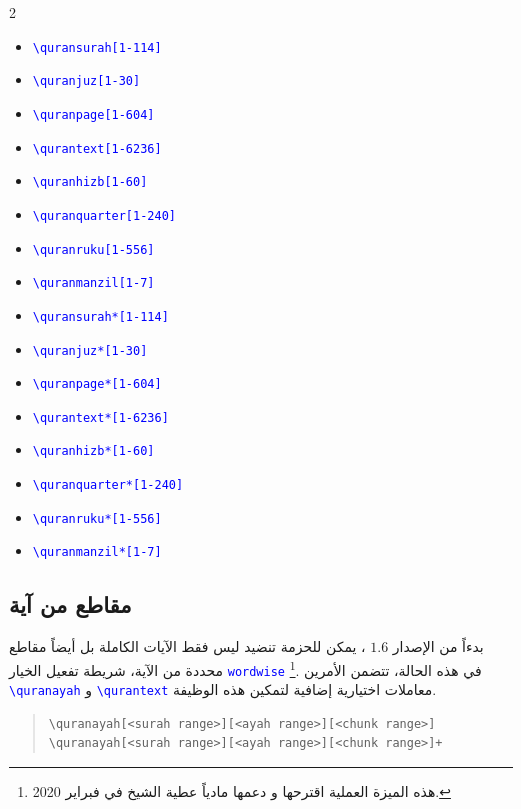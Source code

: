 \documentclass[12pt,a4paper]{article}
\newcommand{\cmd}[1]{\textenglish{\textcolor{blue}{\texttt{\textbackslash #1}}}}
\newcommand{\opt}[1]{\textenglish{\textcolor{blue}{\texttt{#1}}}}
\begin{document}
\begin{center}
\begin{multicols}{2}
\begin{english}
\begin{itemize}
    \item \cmd{quransurah[1-114]}
    \item \cmd{quranjuz[1-30]}
    \item \cmd{quranpage[1-604]}
    \item \cmd{qurantext[1-6236]}
    \item \cmd{quranhizb[1-60]}
    \item \cmd{quranquarter[1-240]}
    \item \cmd{quranruku[1-556]}
    \item \cmd{quranmanzil[1-7]}
    \item \cmd{quransurah*[1-114]}
    \item \cmd{quranjuz*[1-30]}
    \item \cmd{quranpage*[1-604]}
    \item \cmd{qurantext*[1-6236]}
    \item \cmd{quranhizb*[1-60]}
    \item \cmd{quranquarter*[1-240]}
    \item \cmd{quranruku*[1-556]}
    \item \cmd{quranmanzil*[1-7]}
\end{itemize}
\end{english}
\end{multicols}
\end{center}

\subsection{مقاطع من آية}
\label{chunk} 

بدءاً من الإصدار  $1.6$ ، يمكن للحزمة تنضيد ليس فقط الآيات الكاملة بل أيضاً مقاطع محددة من الآية، شريطة تفعيل الخيار 
\opt{wordwise}
\footnote{هذه الميزة العملية اقترحها و دعمها مادياً  عطية الشيخ  في فبراير 2020.}. 
في هذه الحالة، تتضمن الأمرين 
\cmd{quranayah} و 
\cmd{qurantext} معاملات اختيارية إضافية
لتمكين هذه الوظيفة.

\begin{english}
\begin{quote}
\begin{lstlisting}[style=BashInputStyle]
\quranayah[<surah range>][<ayah range>][<chunk range>]
\quranayah[<surah range>][<ayah range>][<chunk range>]+
\end{lstlisting}
\end{quote}
\end{english}
\end{document}

